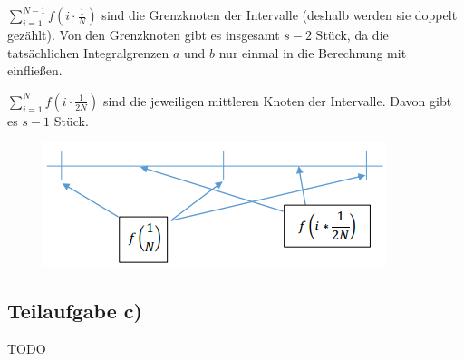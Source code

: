 $\sum_{i=1}^{N-1} f(i \cdot \frac{1}{N})$  sind die Grenzknoten der Intervalle
 (deshalb werden sie doppelt gezählt). Von den Grenzknoten gibt es 
insgesamt $s-2$ Stück, da die tatsächlichen Integralgrenzen $a$ und $b$ 
nur einmal in die Berechnung mit einfließen.

$\sum_{i=1}^N f(i \cdot \frac{1}{2N})$ sind die jeweiligen 
mittleren Knoten der Intervalle. Davon gibt es $s-1$ Stück.

\begin{figure}[h]
    \centering
    \includegraphics*[width=\linewidth, keepaspectratio]{aufgabe4-b.png} 
\end{figure}

\subsection*{Teilaufgabe c)}
TODO

